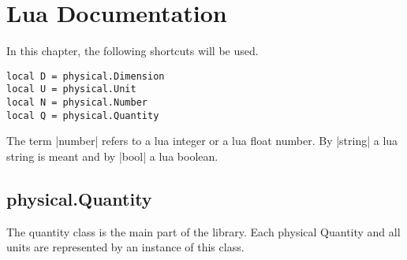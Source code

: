\documentclass{ltxdoc}
\begin{document}
















\newpage
\section{Lua Documentation}

\newcommand{\method}[2]{\subsection*{|#1.#2|}}

\newcommand{\subtitle}[1]{\noindent \\\textbf{#1}}

\lstset{language=Lua}

In this chapter, the following shortcuts will be used.
\begin{lstlisting}
local D = physical.Dimension
local U = physical.Unit
local N = physical.Number
local Q = physical.Quantity
\end{lstlisting}

The term |number| refers to a lua integer or a lua float number. By |string| a lua string is meant and by |bool| a lua boolean.



\subsection{physical.Quantity}
The quantity class is the main part of the library. Each physical Quantity and all units are represented by an instance of this class.
\end{document}
